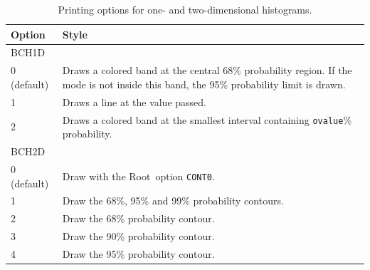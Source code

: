 \documentclass[11pt, a4paper]{article}
\newcommand{\bat}{{\sc BAT}}
\newcommand{\Root}{{\sc Root}}
\begin{document}
\begin{table}[ht!]
\begin{tabular}{ll}
\hline
Option & Style \\
\hline
BCH1D & \\
\hline
0 (default) & \begin{minipage}[l]{12 cm}Draws a colored band at the central 68\% probability region. If the mode is not inside this band, the 95\% probability limit is drawn. \end{minipage}\\
1           & Draws a line at the value passed. \\
2           & Draws a colored band at the smallest interval containing \verb|ovalue|\% probability. \\
\hline
BCH2D & \\
\hline
0 (default) & Draw with the \Root\ option \verb|CONT0|. \\
1           & Draw the 68\%, 95\% and 99\% probability contours. \\
2           & Draw the 68\% probability contour. \\
3           & Draw the 90\% probability contour. \\
4           & Draw the 95\% probability contour. \\
\hline
\end{tabular}
\caption{Printing options for one- and two-dimensional histograms.
\label{table:printingoptions}}
\end{table}




%
\end{document}
